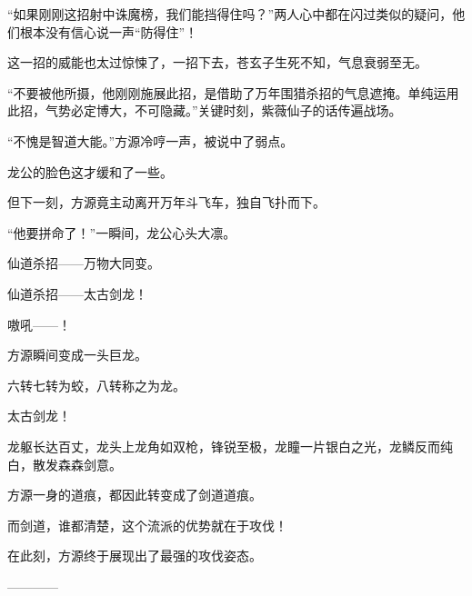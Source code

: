 \begin{this_body}
“如果刚刚这招射中诛魔榜，我们能挡得住吗？”两人心中都在闪过类似的疑问，他们根本没有信心说一声“防得住”！

这一招的威能也太过惊悚了，一招下去，苍玄子生死不知，气息衰弱至无。

“不要被他所摄，他刚刚施展此招，是借助了万年围猎杀招的气息遮掩。单纯运用此招，气势必定博大，不可隐藏。”关键时刻，紫薇仙子的话传遍战场。

“不愧是智道大能。”方源冷哼一声，被说中了弱点。

龙公的脸色这才缓和了一些。

但下一刻，方源竟主动离开万年斗飞车，独自飞扑而下。

“他要拼命了！”一瞬间，龙公心头大凛。

仙道杀招——万物大同变。

仙道杀招——太古剑龙！

嗷吼——！

方源瞬间变成一头巨龙。

六转七转为蛟，八转称之为龙。

太古剑龙！

龙躯长达百丈，龙头上龙角如双枪，锋锐至极，龙瞳一片银白之光，龙鳞反而纯白，散发森森剑意。

方源一身的道痕，都因此转变成了剑道道痕。

而剑道，谁都清楚，这个流派的优势就在于攻伐！

在此刻，方源终于展现出了最强的攻伐姿态。

------------

\end{this_body}

